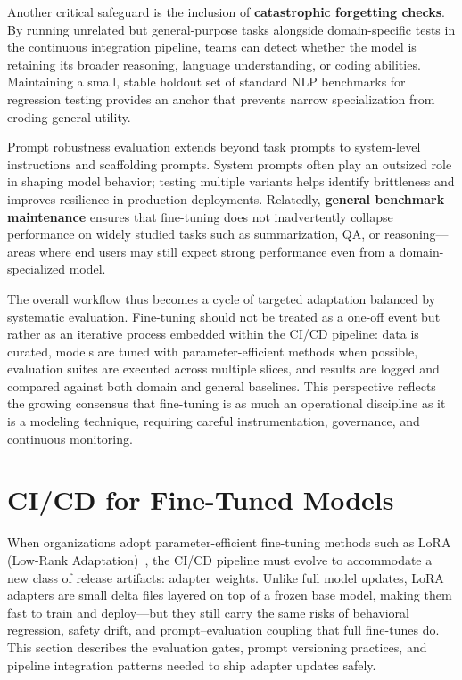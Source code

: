 Another critical safeguard is the inclusion of \textbf{catastrophic forgetting checks}. By running unrelated but general-purpose tasks alongside domain-specific tests in the continuous integration pipeline, teams can detect whether the model is retaining its broader reasoning, language understanding, or coding abilities. Maintaining a small, stable holdout set of standard NLP benchmarks for regression testing provides an anchor that prevents narrow specialization from eroding general utility.

Prompt robustness evaluation extends beyond task prompts to system-level instructions and scaffolding prompts. System prompts often play an outsized role in shaping model behavior; testing multiple variants helps identify brittleness and improves resilience in production deployments. Relatedly, \textbf{general benchmark maintenance} ensures that fine-tuning does not inadvertently collapse performance on widely studied tasks such as summarization, QA, or reasoning---areas where end users may still expect strong performance even from a domain-specialized model.

The overall workflow thus becomes a cycle of targeted adaptation balanced by systematic evaluation. Fine-tuning should not be treated as a one-off event but rather as an iterative process embedded within the CI/CD pipeline: data is curated, models are tuned with parameter-efficient methods when possible, evaluation suites are executed across multiple slices, and results are logged and compared against both domain and general baselines. This perspective reflects the growing consensus that fine-tuning is as much an operational discipline as it is a modeling technique, requiring careful instrumentation, governance, and continuous monitoring.

\section{CI/CD for Fine-Tuned Models}
\label{sec:ch04-finetuning-cicd}

When organizations adopt parameter-efficient fine-tuning methods such as LoRA (Low-Rank Adaptation)~\cite{Hu2022LoRA}, the CI/CD pipeline must evolve to accommodate a new class of release artifacts: adapter weights. Unlike full model updates, LoRA adapters are small delta files layered on top of a frozen base model, making them fast to train and deploy---but they still carry the same risks of behavioral regression, safety drift, and prompt–evaluation coupling that full fine-tunes do. This section describes the evaluation gates, prompt versioning practices, and pipeline integration patterns needed to ship adapter updates safely.

